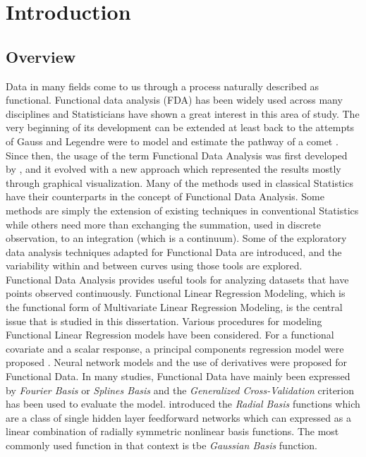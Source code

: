 
\chapter{Introduction} %

\label{Chapter1} %



\section{Overview}
Data in many fields come to us through a process naturally described as functional. Functional data analysis (FDA) has been widely used across many disciplines and Statisticians have shown a great interest in this area of study. The very beginning of its development can be extended at least back to the attempts of Gauss and Legendre were to model and estimate the pathway of a comet \citep{legendre,gauss}. Since then, the usage of the term Functional Data Analysis was first developed by \cite{Reference1}, and it evolved with a new approach which represented the results mostly through graphical visualization. Many of the methods used in classical Statistics have their counterparts in the concept of Functional Data Analysis. Some methods are simply the extension of existing techniques in conventional Statistics while others need more than exchanging the summation, used in discrete observation, to an integration (which is a continuum). Some of the exploratory data analysis techniques adapted for Functional Data are introduced, and the variability within and between curves using those tools are explored.
\\
Functional Data Analysis provides useful tools for analyzing datasets that have points observed continuously. Functional Linear Regression Modeling, which is the functional form of Multivariate Linear Regression Modeling, is the central issue that is studied in this dissertation. Various procedures for modeling Functional Linear Regression models have been considered.  For a functional covariate and a scalar response, a principal components regression model were proposed \citep{fda.usc}. Neural network models and the use of derivatives were proposed for Functional Data. In many studies, Functional Data have mainly been expressed by \textit{Fourier Basis} or \textit{Splines Basis} and the \textit{Generalized Cross-Validation} criterion has been used to evaluate the model. \citet*{Ando2008} introduced the \textit{Radial Basis} functions which are a class of single hidden layer feedforward networks which can expressed as a linear combination of radially symmetric nonlinear basis functions. The most commonly used function in that context is tbe \textit{Gaussian Basis} function. \\
